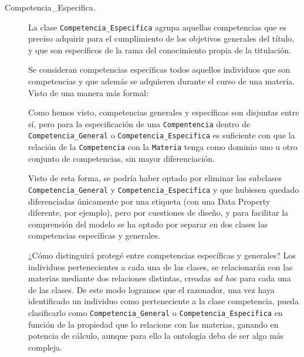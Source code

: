 \begin{description}
		\item[Competencia\_Especifica.] La clase \lstinline!Competencia_Especifica! agrupa aquellas competencias que es preciso adquirir para el cumplimiento de los objetivos generales del título, y que son específicos de la rama del conocimiento propia de la titulación.	

		Se consideran competencias específicas todos aquellos individuos que son competencias y que además se adquieren durante el curso de una materia. Visto de una manera más formal:
			
	
		Como hemos visto, competencias generales y específicas son disjuntas entre sí, pero para la especificación de una \lstinline!Compentencia! dentro de \lstinline!Competencia_General! o \lstinline!Competencia_Especifica! es suficiente con que la relación de la \lstinline!Competencia! con la \lstinline!Materia! tenga como dominio uno u otro conjunto de competencias, sin mayor diferenciación.
  
  		Visto de esta forma, se podría haber optado por eliminar las subclases \lstinline!Competencia_General! y \lstinline!Competencia_Especifica! y que hubiesen quedado diferenciadas únicamente por una etiqueta (con una Data Property diferente, por ejemplo), pero por cuestiones de diseño, y para facilitar la comprensión del modelo se ha optado por separar en dos clases las competencias específicas y generales. 
  
  		¿Cómo distinguirá protegé entre competencias específicas y generales? Los individuos pertenecientes a cada una de las clases, se relacionarán con las materias mediante dos relaciones distintas, creadas \textit{ad hoc} para cada una de las clases. De este modo logramos que el razonador, una vez haya identificado un individuo como perteneciente a la clase competencia, pueda clasificarlo como \lstinline!Competencia_General! o \lstinline!Competencia_Especifica! en función de la propiedad que lo relacione con las materias, ganando en potencia de cálculo, aunque para ello la ontología deba de ser algo más compleja.
      

\end{description}
